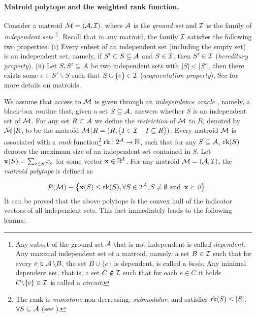 \paragraph{Matroid polytope and the weighted rank function.} Consider a matroid $\operatorname{\mathcal{M}} = (\operatorname{\mathcal{A}}, \operatorname{\mathcal{I}})$, where $\operatorname{\mathcal{A}}$ is the {\em ground set} and $\operatorname{\mathcal{I}}$ is the family of {\em independent sets}
\footnote{Any subset of the ground set $\operatorname{\mathcal{A}}$ that is not independent is called {\em dependent}. Any maximal independent set of a matroid, namely, a set $B \in \operatorname{\mathcal{I}}$ such that for every $e \in \operatorname{\mathcal{A}} \backslash B$, the set $B \cup \{e\}$ is dependent, is called a {\em basis}. Any minimal dependent set, that is, a set $C \notin \operatorname{\mathcal{I}}$ such that for each $e \in C$ it holds $C\backslash \{e\} \in \operatorname{\mathcal{I}}$ is called a {\em circuit}.}. Recall that in any matroid, the family $\operatorname{\mathcal{I}}$ satisfies the following two properties: (i) Every subset of an independent set (including the empty set) is an independent set, namely, if $S' \subset S \subseteq \operatorname{\mathcal{A}}$ and $S \in \operatorname{\mathcal{I}}$, then $S' \in \operatorname{\mathcal{I}}$ ({\em hereditary property}). (ii) Let $S, S' \subseteq \operatorname{\mathcal{A}}$ be two independent sets with $|S| < |S'|$, then there exists some $e \in S' \backslash S$ such that $S \cup \{e\} \in \operatorname{\mathcal{I}}$ ({\em augmentation property}). See \cite{schrijver03, oxley06} for more details on matroids.

We assume that access to $\operatorname{\mathcal{M}}$ is given through an {\em independence oracle} \cite{hausmann81, robinson80}, namely, a black-box routine that, given a set $S \subseteq \operatorname{\mathcal{A}}$, answers whether $S$ is an independent set of $\operatorname{\mathcal{M}}$. 
For any set $R \subset \operatorname{\mathcal{A}}$ we define the {\em restriction} of $\operatorname{\mathcal{M}}$ to $R$, denoted by $\operatorname{\mathcal{M}} | R$, to be the matroid $\operatorname{\mathcal{M}} | R = (R, \{I \in \operatorname{\mathcal{I}}~|~I \subseteq R\})$. Every matroid $\operatorname{\mathcal{M}}$ is associated with a {\em rank} function\footnote{The rank is {\em monotone} non-decreasing, {\em submodular}, and satisfies $\operatorname{rk}(S) \leq |S|$, $\forall S \subseteq \operatorname{\mathcal{A}}$ (see \cite{oxley06}).} $\operatorname{rk}: 2^{\operatorname{\mathcal{A}}} \rightarrow \mathbb{N}$, such that for any $S\subseteq \operatorname{\mathcal{A}}$, $\operatorname{rk}(S)$ denotes the maximum size of an independent set contained in $S$. Let $\operatorname{\mathbf{x}}(S) = \sum_{e \in S} x_e$ for some vector $\operatorname{\mathbf{x}} \in \mathbb{R}^k$. For any matroid $\operatorname{\mathcal{M}} = (\operatorname{\mathcal{A}},\operatorname{\mathcal{I}})$, the {\em matroid polytope} is defined as

$$\mathcal{P}(\operatorname{\mathcal{M}}) \equiv \left\{ \operatorname{\mathbf{x}}(S) \leq \operatorname{rk}(S), \forall S \in 2^{\operatorname{\mathcal{A}}}, S \neq \emptyset \text{ and } \operatorname{\mathbf{x}} \succeq 0 \right\}.
$$
It can be proved \cite{schrijver03} that the above polytope is the convex hull of the indicator vectors of all independent sets. This fact immediately leads to the following lemma: 

